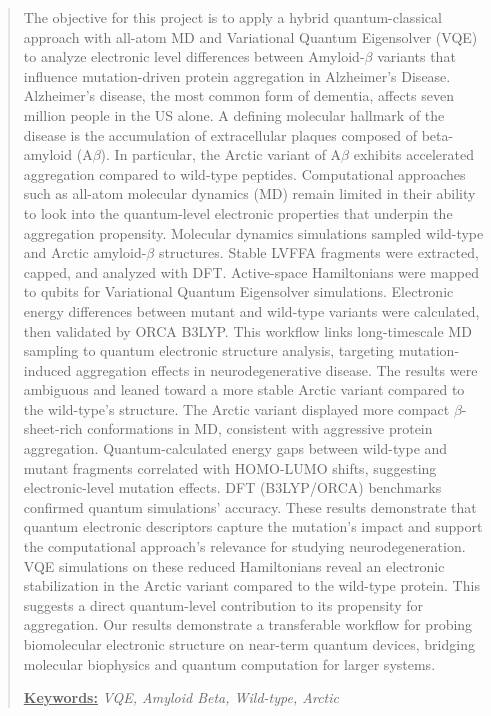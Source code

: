 \documentclass[10pt,a4paper]{article}
\begin{document}
	\begin{abstract}
        
		The objective for this project is to apply a hybrid quantum-classical approach with all-atom MD and Variational Quantum Eigensolver (VQE) to analyze electronic level differences between Amyloid-$\beta$ variants that influence mutation-driven protein aggregation in Alzheimer's Disease. Alzheimer’s disease, the most common form of dementia, affects seven million people in the US alone. A defining molecular hallmark of the disease is the accumulation of extracellular plaques composed of beta-amyloid (A$\beta$). In particular, the Arctic variant of A$\beta$ exhibits accelerated aggregation compared to wild-type peptides. Computational approaches such as all-atom molecular dynamics (MD) remain limited in their ability to look into the quantum-level electronic properties that underpin the aggregation propensity. Molecular dynamics simulations sampled wild-type and Arctic amyloid-$\beta$ structures. Stable LVFFA fragments were extracted, capped, and analyzed with DFT. Active-space Hamiltonians were mapped to qubits for Variational Quantum Eigensolver simulations. Electronic energy differences between mutant and wild-type variants were calculated, then validated by ORCA B3LYP. This workflow links long-timescale MD sampling to quantum electronic structure analysis, targeting mutation-induced aggregation effects in neurodegenerative disease. The results were ambiguous and leaned toward a more stable Arctic variant compared to the wild-type's structure. The Arctic variant displayed more compact $\beta$-sheet-rich conformations in MD, consistent with aggressive protein aggregation. Quantum-calculated energy gaps between wild-type and mutant fragments correlated with HOMO-LUMO shifts, suggesting electronic-level mutation effects. DFT (B3LYP/ORCA) benchmarks confirmed quantum simulations’ accuracy. These results demonstrate that quantum electronic descriptors capture the mutation’s impact and support the computational approach’s relevance for studying neurodegeneration. VQE simulations on these reduced Hamiltonians reveal an electronic stabilization in the Arctic variant compared to the wild-type protein. This suggests a direct quantum-level contribution to its propensity for aggregation. Our results demonstrate a transferable workflow for probing biomolecular electronic structure on near-term quantum devices, bridging molecular biophysics and quantum computation for larger systems.
\vspace{2mm}

\underline{\textbf{Keywords:}} \hspace{1mm} \textit{VQE, Amyloid Beta, Wild-type, Arctic}
	\end{abstract}
\end{document}
